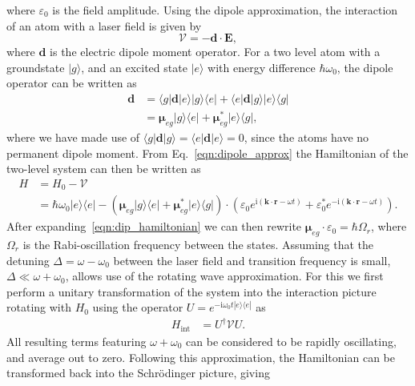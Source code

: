 where $\varepsilon_0$ is the field amplitude. Using the dipole approximation, the interaction of an atom with a laser field is given by~\cite{BK:Foot_2005}
\begin{equation}
\mathcal{V} = -{\mathbf{d}}\cdot {\mathbf{E}},
\end{equation}
where ${\mathbf{d}}$ is the electric dipole moment operator. For a two level atom with a groundstate $| g \rangle$, and an excited state $| e \rangle$ with energy difference $\hbar \omega_0$, the dipole operator can be written as
\begin{align}\label{eqn:dipole_approx}
\mathbf{d} &= \langle g|\mathbf{d}|e \rangle | g \rangle \langle e | + \langle e|\mathbf{d}|g \rangle | e \rangle \langle g | \nonumber \\
&= \boldsymbol{\mu}_{eg} | g \rangle \langle e | + \boldsymbol{\mu}_{eg}^{*} | e \rangle \langle g |,
\end{align}
where we have made use of $\langle g|\mathbf{d}|g \rangle = \langle e|\mathbf{d}|e \rangle  = 0$, since the atoms have no permanent dipole moment. From Eq.~\eqref{eqn:dipole_approx} the Hamiltonian of the two-level system can then be written as
\begin{align}\label{eqn:dip_hamiltonian}
    H &= H_0  - \mathcal{V} \nonumber \\
      &=  \hbar\omega_0 |e\rangle\langle e | - (\boldsymbol{\mu}_{eg} | g \rangle \langle e | + \boldsymbol{\mu}_{eg}^{*} | e \rangle \langle g |)\cdot ( \varepsilon_0 e^{\textrm{i}\left(\mathbf{k}\cdot\mathbf{r} - \omega t\right)} +  \varepsilon_0^{*} e^{-\textrm{i}\left(\mathbf{k}\cdot\mathbf{r} - \omega t\right)}).
\end{align}
After expanding~\eqref{eqn:dip_hamiltonian} we can then rewrite $\boldsymbol{\mu}_{eg}\cdot \varepsilon_0 = \hbar\Omega_r$, where $\Omega_r$ is the Rabi-oscillation frequency between the states. Assuming that the detuning $\Delta = \omega - \omega_0$ between the laser field and transition frequency is small, $\Delta \ll \omega + \omega_0$, allows use of the rotating wave approximation. For this we first perform a unitary transformation of the system into the interaction picture rotating with $H_0$ using the operator $U = e^{-\textrm{i}\omega_0 t|e\rangle\langle e|}$ as
\begin{align}
    H_{\textrm{int}} & = U^{\dagger} \mathcal{V} U.
\end{align}
All resulting terms featuring $\omega + \omega_0$ can be considered to be rapidly oscillating, and average out to zero. Following this approximation, the Hamiltonian can be transformed back into the Schr\"odinger picture, giving

